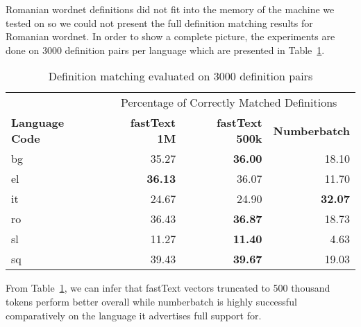 Romanian wordnet definitions did not fit into the memory of the machine we tested on so we could not present the full definition matching results for Romanian wordnet.
In order to show a complete picture, the experiments are done on 3000 definition pairs per language which are presented in Table~\ref{tab:lapjv_3000}.

\begin{table}[htbp]
    \centering
    \begin{tabular}{lrrr}
        \toprule
& \multicolumn{3}{c}{Percentage of Correctly Matched Definitions} \\
\cmidrule(lr){2-4}
        \textbf{Language Code} & \textbf{fastText 1M} & \textbf{fastText 500k} & \textbf{Numberbatch} \\
        \midrule
        bg & 35.27 & \textbf{36.00} & 18.10 \\
        el & \textbf{36.13} & 36.07 & 11.70 \\
        it & 24.67 & 24.90 & \textbf{32.07} \\
        ro & 36.43 & \textbf{36.87} & 18.73 \\
        sl & 11.27 & \textbf{11.40} & 4.63 \\
        sq & 39.43 & \textbf{39.67} & 19.03 \\
        \bottomrule
    \end{tabular}
    \caption{Definition matching evaluated on 3000 definition pairs}%
    \label{tab:lapjv_3000}
\end{table}

From Table~\ref{tab:lapjv_3000}, we can infer that fastText vectors truncated to 500 thousand tokens perform better overall while numberbatch is highly successful comparatively on the language it advertises full support for.



